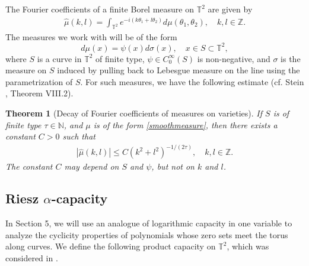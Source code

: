 \documentclass[11 pt,reqno]{amsart}
\newtheorem{thm}{Theorem}[section]
\theoremstyle{definition}
\theoremstyle{remark}
\numberwithin{equation}{section} \numberwithin{figure}{section}
\begin{document}
The Fourier coefficients of a finite Borel measure on $\mathbb{T}^2$ are given by
\begin{align}\label{Fourier}
\hat{\mu}(k,l)=\int_{\mathbb{T}^2}e^{-i(k\theta_1+l\theta_2)}d\mu(\theta_1,\theta_2),
\quad k,l \in \mathbb{Z}.
\end{align}
The measures we work with will be of the form
\begin{equation}
d\mu(x)=\psi(x)d\sigma(x), \quad x\in S\subset \mathbb{T}^2,
\label{smoothmeasure}
\end{equation}
where $S$ is a curve in $\mathbb{T}^2$ of finite type, $\psi\in
C^{\infty}_0(S)$ is non-negative, and $\sigma$ is the measure on $S$
induced by pulling back to Lebesgue measure on the line using the
parametrization of $S$. For such measures, we have the following
estimate (cf. Stein \cite{SteinHarmAnaBook}, Theorem VIII.2).
\begin{thm}[Decay of Fourier coefficients of measures on varieties]\label{t-oscillatory}
If $S$ is of finite type $\tau\in \mathbb{N}$, and $\mu$ is of the form \eqref{smoothmeasure}, then there exists a constant $C>0$ such that
\begin{align*}
|\hat{\mu}(k,l)|\le C (k^2+l^2)^{-1/(2\tau)}, \quad k,l\in \mathbb{Z}.
\end{align*}
The constant $C$ may depend on $S$ and $\psi$, but not on $k$ and $l$.
\end{thm}

\subsection{Riesz $\alpha$-capacity}\label{alphacapa}
In Section 5, we will use an analogue of logarithmic capacity in one variable to analyze the cyclicity properties of polynomials whose zero sets meet the torus along curves.  We define the following product capacity on $\mathbb{T}^2$, which was
considered in \cite{BCLSS13II}.
\end{document}
